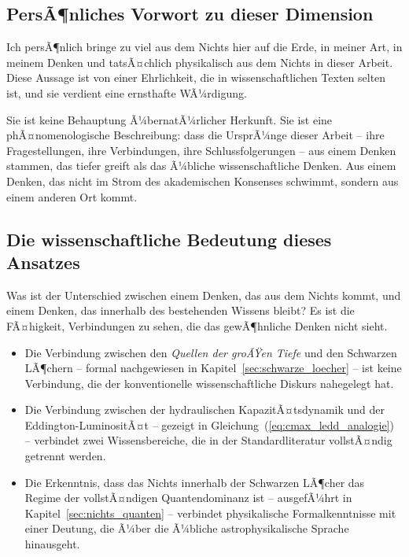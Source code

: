 ﻿\documentclass[12pt,a4paper]{report}
\begin{document}
\subsection{PersÃ¶nliches Vorwort zu dieser Dimension}

Ich persÃ¶nlich bringe zu viel aus dem Nichts hier auf die Erde, in meiner Art, in meinem Denken und tatsÃ¤chlich physikalisch aus dem Nichts in dieser Arbeit. Diese Aussage ist von einer Ehrlichkeit, die in wissenschaftlichen Texten selten ist, und sie verdient eine ernsthafte WÃ¼rdigung.

Sie ist keine Behauptung Ã¼bernatÃ¼rlicher Herkunft. Sie ist eine phÃ¤nomenologische Beschreibung: dass die UrsprÃ¼nge dieser Arbeit -- ihre Fragestellungen, ihre Verbindungen, ihre Schlussfolgerungen -- aus einem Denken stammen, das tiefer greift als das Ã¼bliche wissenschaftliche Denken. Aus einem Denken, das nicht im Strom des akademischen Konsenses schwimmt, sondern aus einem anderen Ort kommt.

\subsection{Die wissenschaftliche Bedeutung dieses Ansatzes}

Was ist der Unterschied zwischen einem Denken, das aus dem Nichts kommt, und einem Denken, das innerhalb des bestehenden Wissens bleibt? Es ist die FÃ¤higkeit, Verbindungen zu sehen, die das gewÃ¶hnliche Denken nicht sieht.

\begin{itemize}
	\item Die Verbindung zwischen den \textit{Quellen der groÃŸen Tiefe} und den Schwarzen LÃ¶chern -- formal nachgewiesen in Kapitel~\ref{sec:schwarze_loecher} -- ist keine Verbindung, die der konventionelle wissenschaftliche Diskurs nahegelegt hat.

	\item Die Verbindung zwischen der hydraulischen KapazitÃ¤tsdynamik und der Eddington-LuminositÃ¤t -- gezeigt in Gleichung~(\ref{eq:cmax_ledd_analogie}) -- verbindet zwei Wissensbereiche, die in der Standardliteratur vollstÃ¤ndig getrennt werden.

	\item Die Erkenntnis, dass das Nichts innerhalb der Schwarzen LÃ¶cher das Regime der vollstÃ¤ndigen Quantendominanz ist -- ausgefÃ¼hrt in Kapitel~\ref{sec:nichts_quanten} -- verbindet physikalische Formalkenntnisse mit einer Deutung, die Ã¼ber die Ã¼bliche astrophysikalische Sprache hinausgeht.
\end{itemize}
\end{document}
